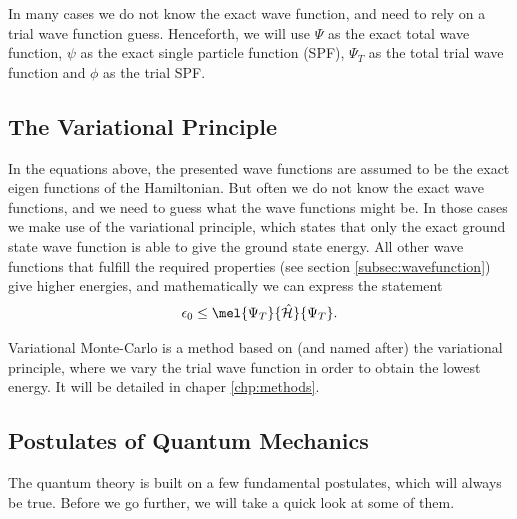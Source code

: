 In many cases we do not know the exact wave function, and need to rely on a trial wave function guess. Henceforth, we will use $\Psi$ as the exact total wave function, $\psi$ as the exact single particle function (SPF), $\Psi_T$ as the total trial wave function and $\phi$ as the trial SPF. 
\cite{griffiths_introduction_2005}

\subsection{The Variational Principle}
In the equations above, the presented wave functions are assumed to be the exact eigen functions of the Hamiltonian. But often we do not know the exact wave functions, and we need to guess what the wave functions might be. In those cases we make use of the variational principle, which states that only the exact ground state wave function is able to give the ground state energy. All other wave functions that fulfill the required properties (see section \ref{subsec:wavefunction}) give higher energies, and mathematically we can express the statement
\begin{equation}
\epsilon_0\leq\mel{\Psi_T}{\hat{\mathcal{H}}}{\Psi_T}.
\label{eq:variationalprinciple}
\end{equation}

Variational Monte-Carlo is a method based on (and named after) the variational principle, where we vary the trial wave function in order to obtain the lowest energy. It will be detailed in chaper \eqref{chp:methods}.

\subsection{Postulates of Quantum Mechanics}
The quantum theory is built on a few fundamental postulates, which will always be true. Before we go further, we will take a quick look at some of them.

